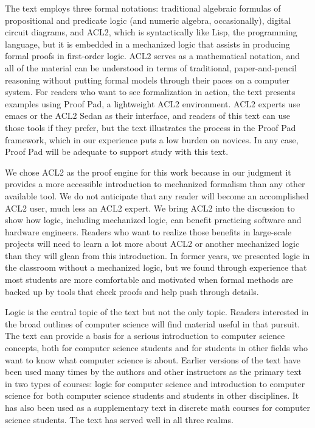 \begin{preface}
The text employs three formal notations:
traditional algebraic formulas of propositional and predicate logic
(and numeric algebra, occasionally),
digital circuit diagrams, and ACL2, which is syntactically
like Lisp, the programming language, but it is embedded
in a mechanized logic that assists in producing
formal proofs in first-order logic.
ACL2 serves as a mathematical notation, and all
of the material can be understood in terms of
traditional, paper-and-pencil reasoning
without putting formal models
through their paces on a computer system.
For readers who want to see formalization
in action, the text presents examples using
Proof Pad, a lightweight ACL2 environment.
ACL2 experts use emacs or the ACL2 Sedan
as their interface, and readers of this text can
use those tools if they prefer, but the text
illustrates the process in the Proof Pad framework,
which in our experience puts a low burden on novices.
In any case, Proof Pad will be adequate to support
study with this text.

We chose ACL2 as the proof engine for this work
because in our judgment it provides a more accessible
introduction to mechanized formalism than any other
available tool. We do not anticipate that any
reader will become an accomplished ACL2 user,
much less an ACL2 expert. We bring ACL2 into the discussion
to show how logic, including mechanized logic,
can benefit practicing software and hardware engineers.
Readers who want to realize those benefits in
large-scale projects will need to learn a lot more
about ACL2 or another mechanized logic than they
will glean from this introduction.
In former years, we presented logic in the classroom
without a mechanized logic, but we found through experience
that most students are more comfortable and motivated
when formal methods are backed up by tools
that check proofs and help
push through details.

Logic is the central topic of the text but not the only topic.
Readers interested in the broad outlines of computer science
will find material useful in that pursuit.
The text can provide a basis for a serious introduction
to computer science concepts, both for computer science students
and for students in other fields who want to know
what computer science is about.
Earlier versions of the text have been used many times
by the authors and other instructors
as the primary text in two types of courses: logic for computer science
and introduction to computer science for both computer science students
and students in other disciplines.
It has also been used as a supplementary
text in discrete math courses for computer science students.
The text has served well in all three realms.


\end{preface}
